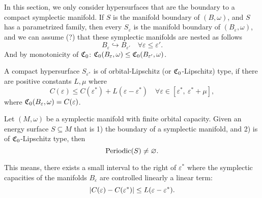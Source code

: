 \documentclass[../main-v2-manifolds.tex]{subfiles}
\begin{document}
In this section, we only consider hypersurfaces that are the boundary to a compact symplectic manifold. If $S$ is the manifold boundary of $(B,\omega)$, and $S$ has a parametrized family, then every $S_{\varepsilon}$ is the manifold boundary of $(B_\varepsilon,\omega)$, and we can assume (?) that these symplectic manifolds are nested as follows
\[
    B_{\varepsilon}\hookrightarrow B_{\varepsilon'}\quad\forall\varepsilon\leq\varepsilon'.
\]
And by monotonicity of $\mathfrak{C}_0$: $\mathfrak{C}_0(B_{\varepsilon},\omega)\leq\mathfrak{C}_{0}(B_{\varepsilon'},\omega)$.
\begin{definition}
    A compact hypersurface $S_{\varepsilon^*}$ is of orbital-Lipschitz (or $\mathfrak{C}_0$-Lipschitz) type, if there are positive constants $L, \mu$ where
    \[
        C(\varepsilon)\leq C(\varepsilon^*) + L(\varepsilon - \varepsilon^*)\quad\forall \varepsilon \in [\varepsilon^*,\: \varepsilon^* +\mu],
    \]
    where $\mathfrak{C}_0(B_{\varepsilon},\omega) = C(\varepsilon)$.
\end{definition}
\begin{wts}
    Let $(M,\omega)$ be a symplectic manifold with finite orbital capacity. Given an energy surface $S\subseteq M$ that is 1) the boundary of a symplectic manifold, and 2) is of $\mathfrak{C}_0$-Lipschitz type, then
    \[
        \mathrm{Periodic}(S)\neq \varnothing.
    \]
\end{wts}
\begin{remark}
    This means, there exists a small interval to the right of $\varepsilon^*$ where the symplectic capacities of the manifolds $B_{\varepsilon}$ are controlled linearly a linear term:
    \[
        \vert {C(\varepsilon) - C(\varepsilon^*)} \vert\leq L(\varepsilon - \varepsilon^*).
    \]
\end{remark}

\end{document}
